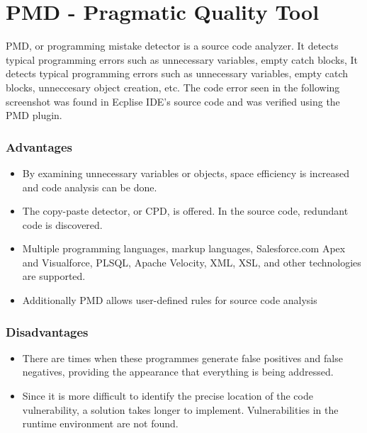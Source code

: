 \documentclass[12pt,a4paper]{report}
\begin{document}
\newpage
\section{PMD - Pragmatic Quality Tool}
PMD, or programming mistake detector is a source code analyzer. It detects typical programming errors such as unnecessary variables, empty catch blocks, It detects typical programming errors such as unnecessary variables, empty catch blocks, unneccesary object creation, etc. The code error seen in the following screenshot was found in Ecplise IDE's source code and was verified using the PMD plugin. \\ 
\subsubsection{Advantages}
    \begin{itemize}[noitemsep]
        \item By examining unnecessary variables or objects, space efficiency is increased and code analysis can be done.
        \item The copy-paste detector, or CPD, is offered. In the source code, redundant code is discovered.
        \item Multiple programming languages, markup languages, Salesforce.com Apex and Visualforce, PLSQL, Apache Velocity, XML, XSL, and other technologies are supported.
        \item Additionally PMD allows user-defined rules for source code analysis
    \end{itemize}
\subsubsection{Disadvantages}
    \begin{itemize}[noitemsep]
        \item There are times when these programmes generate false positives and false negatives, providing the appearance that everything is being addressed.
        \item Since it is more difficult to identify the precise location of the code vulnerability, a solution takes longer to implement. Vulnerabilities in the runtime environment are not found.
    \end{itemize}
\end{document}
